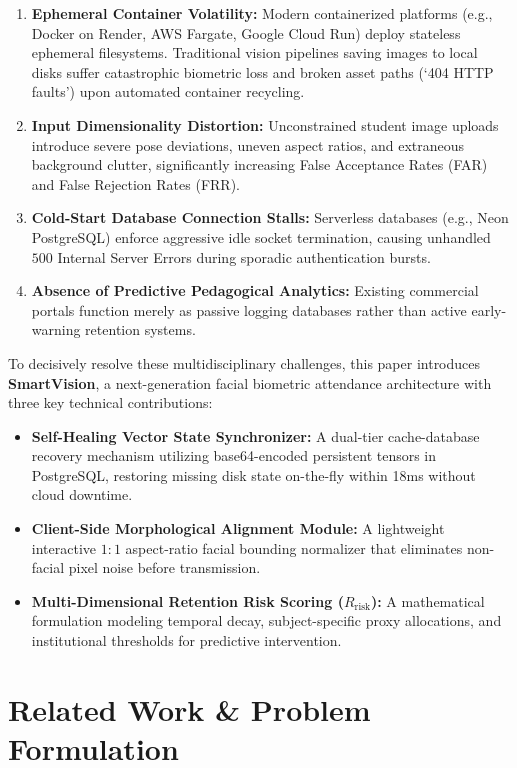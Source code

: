 \documentclass[conference]{IEEEtran}
\begin{document}
\begin{enumerate}
    \item \textbf{Ephemeral Container Volatility:} Modern containerized platforms (e.g., Docker on Render, AWS Fargate, Google Cloud Run) deploy stateless ephemeral filesystems. Traditional vision pipelines saving images to local disks suffer catastrophic biometric loss and broken asset paths (`404 HTTP faults') upon automated container recycling.
    \item \textbf{Input Dimensionality Distortion:} Unconstrained student image uploads introduce severe pose deviations, uneven aspect ratios, and extraneous background clutter, significantly increasing False Acceptance Rates (FAR) and False Rejection Rates (FRR).
    \item \textbf{Cold-Start Database Connection Stalls:} Serverless databases (e.g., Neon PostgreSQL) enforce aggressive idle socket termination, causing unhandled $500$ Internal Server Errors during sporadic authentication bursts.
    \item \textbf{Absence of Predictive Pedagogical Analytics:} Existing commercial portals function merely as passive logging databases rather than active early-warning retention systems.
\end{enumerate}

To decisively resolve these multidisciplinary challenges, this paper introduces \textbf{SmartVision}, a next-generation facial biometric attendance architecture with three key technical contributions:
\begin{itemize}
    \item \textbf{Self-Healing Vector State Synchronizer:} A dual-tier cache-database recovery mechanism utilizing base64-encoded persistent tensors in PostgreSQL, restoring missing disk state on-the-fly within 18ms without cloud downtime.
    \item \textbf{Client-Side Morphological Alignment Module:} A lightweight interactive $1:1$ aspect-ratio facial bounding normalizer that eliminates non-facial pixel noise before transmission.
    \item \textbf{Multi-Dimensional Retention Risk Scoring ($R_{\text{risk}}$):} A mathematical formulation modeling temporal decay, subject-specific proxy allocations, and institutional thresholds for predictive intervention.
\end{itemize}

\section{Related Work \& Problem Formulation}
\end{document}
